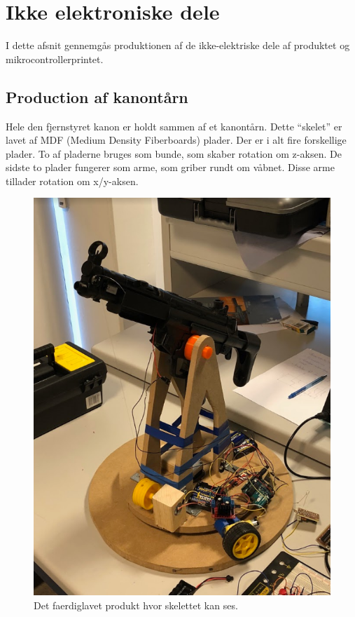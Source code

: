 \section{Ikke elektroniske dele}
I dette afsnit gennemgås produktionen af de ikke-elektriske dele af produktet og mikrocontrollerprintet.

\subsection{Production af kanontårn}
Hele den fjernstyret kanon er holdt sammen af et kanontårn. Dette “skelet” er lavet af MDF (Medium Density Fiberboards) plader. Der er i alt fire forskellige plader. To af pladerne bruges som bunde, som skaber rotation om z-aksen. De sidste to plader fungerer som arme, som griber rundt om våbnet. Disse arme tillader rotation om x/y-aksen. \\

\begin{figure}[H]
\centering
\includegraphics[scale=0.4]{Billeder/Kanontarn.PNG}
\caption{Det faerdiglavet produkt hvor skelettet kan ses.}
\label{fig:Kanontarn_faerdig}
\end{figure}

